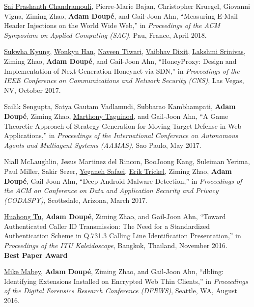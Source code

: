 \documentclass[11pt,letterpaper,sans]{moderncv}
\begin{document}
\begin{etaremune}
\item \underline{Sai Prashanth Chandramouli}, Pierre-Marie Bajan,
  Christopher Kruegel, Giovanni Vigna, Ziming Zhao, \textbf{Adam Doup\'e}, and
  Gail-Joon Ahn, ``Measuring E-Mail Header Injections on the World
  Wide Web,'' in \emph{Proceedings of the ACM Symposium on Applied
    Computing (SAC)}, Pau, France, April 2018.

\item \underline{Sukwha Kyung}, \underline{Wonkyu Han},
  \underline{Naveen Tiwari}, \underline{Vaibhav Dixit},
  \underline{Lakshmi Srinivas}, Ziming Zhao, \textbf{Adam Doup\'e}, and
  Gail-Joon Ahn, ``HoneyProxy: Design and Implementation of
  Next-Generation Honeynet via SDN,'' in \emph{Proceedings of the IEEE
    Conference on Communications and Network Security (CNS)}, Las
  Vegas, NV, October 2017.

\item Sailik Sengupta, Satya Gautam Vadlamudi, Subbarao Kambhampati,
  \textbf{Adam Doup\'e}, Ziming Zhao, \underline{Marthony Taguinod},
  and Gail-Joon Ahn, ``A Game Theoretic Approach of Strategy
  Generation for Moving Target Defense in Web Applications,'' in
  \emph{Proceedings of the International Conference on Autonomous Agents
    and Multiagent Systems (AAMAS)}, Sao Paulo, May 2017.

\item Niall McLaughlin, Jesus Martinez del Rincon, BooJoong Kang,
  Suleiman Yerima, Paul Miller, Sakir Sezer, \underline{Yeganeh
    Safaei}, \underline{Erik Trickel}, Ziming Zhao, \textbf{Adam
    Doup\'e}, Gail-Joon Ahn, ``Deep Android Malware Detection,'' in
  \emph{Proceedings of the ACM on Conference on Data and Application
    Security and Privacy (CODASPY)}, Scottsdale, Arizona, March 2017.

\item \underline{Huahong Tu}, \textbf{Adam Doup\'e}, Ziming Zhao, and
  Gail-Joon Ahn, ``Toward Authenticated Caller ID Transmission: The
  Need for a Standardized Authentication Scheme in Q.731.3 Calling
  Line Identification Presentation,'' in \emph{Proceedings of the ITU
    Kaleidoscope}, Bangkok, Thailand, November 2016. \\
  \textbf{Best Paper Award}

\item \underline{Mike Mabey}, \textbf{Adam Doup\'e}, Ziming Zhao, and
  Gail-Joon Ahn, ``dbling: Identifying Extensions Installed on
  Encrypted Web Thin Clients,'' in \emph{Proceedings of the Digital
    Forensics Research Conference (DFRWS)}, Seattle, WA, August 2016.


\end{etaremune}
\end{document}
